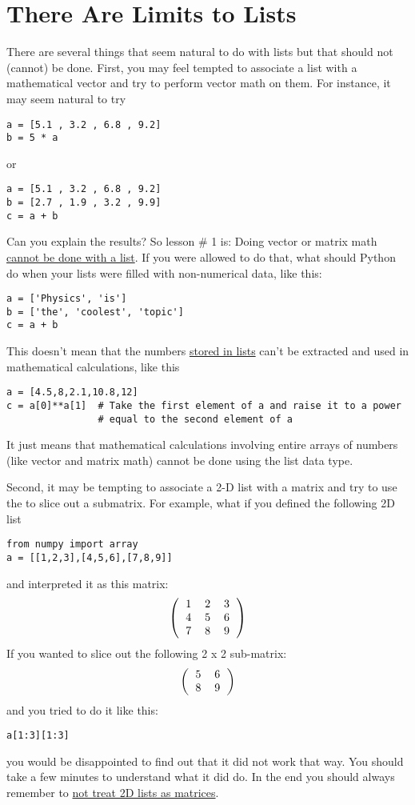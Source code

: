 \section{There Are Limits to Lists}
There are several things that seem natural to do with lists but that
should not (cannot) be done.  First, you may feel tempted to associate a list with a mathematical
vector and try to perform vector math on them. For instance, it may
seem natural to try
\begin{Verbatim}
a = [5.1 , 3.2 , 6.8 , 9.2]
b = 5 * a
\end{Verbatim}
or
\begin{Verbatim}
a = [5.1 , 3.2 , 6.8 , 9.2]
b = [2.7 , 1.9 , 3.2 , 9.9]
c = a + b
\end{Verbatim}
Can you explain the results?  So lesson \# 1 is: Doing vector or
matrix math \underline{cannot be done with a list}.  If you were
allowed to do that, what should Python do when your lists were filled
with non-numerical data, like this:
\begin{Verbatim}
a = ['Physics', 'is']
b = ['the', 'coolest', 'topic']
c = a + b
\end{Verbatim}
  This doesn't mean that the numbers \ul{stored in
  lists} can't be extracted and used in mathematical calculations,
like this
\begin{Verbatim}
a = [4.5,8,2.1,10.8,12]
c = a[0]**a[1]  # Take the first element of a and raise it to a power
                # equal to the second element of a
\end{Verbatim}
It just means that mathematical calculations involving entire arrays
of numbers (like vector and matrix math) cannot be done using the list
data type.

Second, it may be tempting to associate a
2-D list with a matrix and try to use the \code{:} to slice out a
submatrix.  For example, what if you defined the following 2D list
\begin{Verbatim}
from numpy import array
a = [[1,2,3],[4,5,6],[7,8,9]]
\end{Verbatim}
and interpreted it as this matrix:
\begin{equation}
\left( \begin{tabular}{ccc}
1 & 2 & 3\\
4 & 5 & 6\\
7 & 8 & 9\\
\end{tabular}
\right)
\end{equation}
If you wanted to slice out the following 2 x 2 sub-matrix:
\begin{equation}
\left(\begin{tabular}{cc}
5 & 6 \\
8 & 9 \\
\end{tabular}
\right)
\end{equation}
and you tried to do it like this:
\begin{Verbatim}
a[1:3][1:3]
\end{Verbatim}
you would be disappointed to find out that it did not work that way.
You should take a few minutes to understand what it did do.  In the
end you should always remember to \ul{not treat 2D lists as matrices}.

